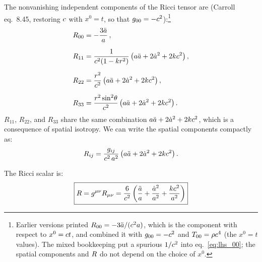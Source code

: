The nonvanishing independent components of the Ricci tensor are
(Carroll eq.~8.45, restoring $c$ with $x^0 = t$, so that
$g_{00} = -c^2$):\footnote{Earlier versions printed
$R_{00} = -3\ddot a/(c^2 a)$, which is the component with respect
to $x^0 = c t$, and combined it with $g_{00} = -c^2$
and $T_{00} = \rho c^4$ (the $x^0 = t$ values).  The mixed
bookkeeping put a spurious $1/c^2$ into
eq.~\eqref{eq:lhs_00}; the spatial components and $R$ do not depend on
the choice of $x^0$.}
\begin{align}
    R_{00} &= -\frac{3\ddot{a}}{a} \,,
    \label{eq:R00} \\[6pt]
    R_{11} &= \frac{1}{c^2(1-kr^2)}
    \left(a\ddot{a} + 2\dot{a}^2 + 2kc^2\right) ,
    \label{eq:R11} \\[6pt]
    R_{22} &= \frac{r^2}{c^2}
    \left(a\ddot{a} + 2\dot{a}^2 + 2kc^2\right) ,
    \label{eq:R22} \\[6pt]
    R_{33} &= \frac{r^2\sin^2\!\theta}{c^2}
    \left(a\ddot{a} + 2\dot{a}^2 + 2kc^2\right) .
    \label{eq:R33}
\end{align}
$R_{11}$, $R_{22}$, and $R_{33}$ share the same
combination $a\ddot{a} + 2\dot{a}^2 + 2kc^2$, which is a
consequence of spatial isotropy.  We can write the spatial components
compactly as:
\begin{equation}
    R_{ij} = \frac{g_{ij}}{c^2\, a^2}
    \left(a\ddot{a} + 2\dot{a}^2 + 2kc^2\right) .
    \label{eq:Rij_compact}
\end{equation}

The Ricci scalar is:
\begin{equation}
    \boxed{
    R = g^{\mu\nu} R_{\mu\nu}
    = \frac{6}{c^2}
    \left(\frac{\ddot{a}}{a} + \frac{\dot{a}^2}{a^2}
    + \frac{kc^2}{a^2}\right)
    }
    \label{eq:ricci_scalar_frw}
\end{equation}


